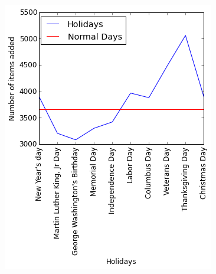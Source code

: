 \begin{figure}[!h]
\begin{minipage}{.25\textwidth}
  \centering
  \includegraphics[width=.9\linewidth]{diff.png}
  \label{diffholiday}
\end{minipage}
\end{figure}




